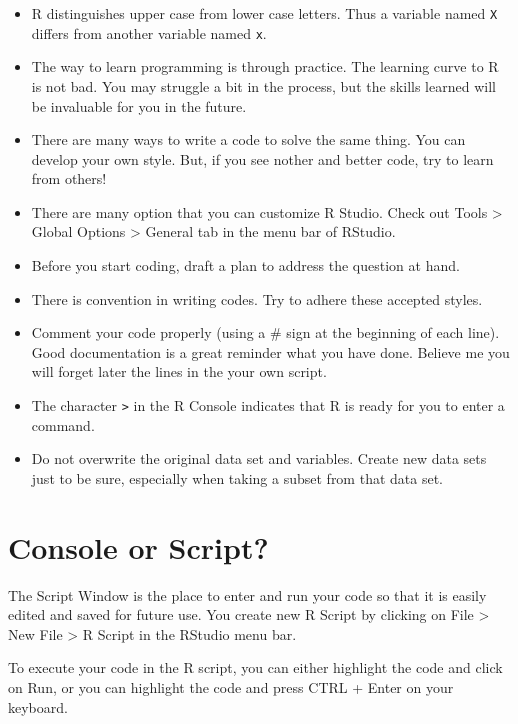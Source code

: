 \documentclass[
]{book}
\providecommand{\tightlist}{%
  \setlength{\itemsep}{0pt}\setlength{\parskip}{0pt}}
\theoremstyle{definition}
\theoremstyle{definition}
\theoremstyle{definition}
\theoremstyle{definition}
\theoremstyle{remark}
\begin{document}
\begin{itemize}
\tightlist
\item
  R distinguishes upper case from lower case letters. Thus a variable named \texttt{X} differs from another variable named \texttt{x}.
\item
  The way to learn programming is through practice. The learning curve to R is not bad. You may struggle a bit in the process, but the skills learned will be invaluable for you in the future.
\item
  There are many ways to write a code to solve the same thing. You can develop your own style. But, if you see nother and better code, try to learn from others!
\item
  There are many option that you can customize R Studio. Check out Tools \textgreater{} Global Options \textgreater{} General tab in the menu bar of RStudio.
\item
  Before you start coding, draft a plan to address the question at hand.
\item
  There is convention in writing codes. Try to adhere these accepted styles.
\item
  Comment your code properly (using a \# sign at the beginning of each line). Good documentation is a great reminder what you have done. Believe me you will forget later the lines in the your own script.
\item
  The character \texttt{\textgreater{}} in the R Console indicates that R is ready for you to enter a command.\\
\item
  Do not overwrite the original data set and variables. Create new data sets just to be sure, especially when taking a subset from that data set.
\end{itemize}

\hypertarget{console-or-script}{%
\section{Console or Script?}\label{console-or-script}}

The Script Window is the place to enter and run your code so that it is easily edited and saved for future use. You create new R Script by clicking on File \textgreater{} New File \textgreater{} R Script in the RStudio menu bar.

To execute your code in the R script, you can either highlight the code and click on Run, or you can highlight the code and press CTRL + Enter on your keyboard.
\end{document}
